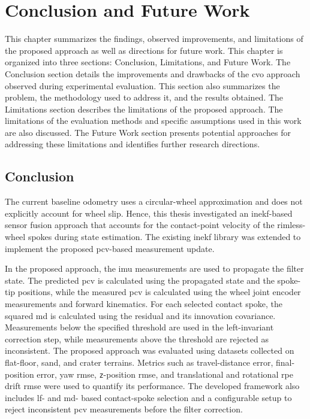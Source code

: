 \documentclass[report.tex]{subfiles}
\begin{document}
    \chapter{Conclusion and Future Work} \label{chap:conclusionandfuturework}

    This chapter summarizes the findings, observed improvements, and limitations of the proposed approach as well as directions for future work. This chapter is organized into three sections: Conclusion, Limitations, and Future Work. The Conclusion section details the improvements and drawbacks of the \gls{cvo} approach observed during experimental evaluation. This section also summarizes the problem, the methodology used to address it, and the results obtained. The Limitations section describes the limitations of the proposed approach. The limitations of the evaluation methods and specific assumptions used in this work are also discussed. The Future Work section presents potential approaches for addressing these limitations and identifies further research directions.
    
    \section{Conclusion}

    The current baseline odometry uses a circular-wheel approximation and does not explicitly account for wheel slip. Hence, this thesis investigated an \gls{inekf}-based sensor fusion approach that accounts for the contact-point velocity of the rimless-wheel spokes during state estimation. The existing \gls{inekf} library was extended to implement the proposed \gls{pcv}-based measurement update.

    In the proposed approach, the \gls{imu} measurements are used to propagate the filter state. The predicted \gls{pcv} is calculated using the propagated state and the spoke-tip positions, while the measured \gls{pcv} is calculated using the wheel joint encoder measurements and forward kinematics. For each selected contact spoke, the squared \gls{md} is calculated using the residual and its innovation covariance. Measurements below the specified threshold are used in the left-invariant correction step, while measurements above the threshold are rejected as inconsistent. The proposed approach was evaluated using datasets collected on flat-floor, sand, and crater terrains. Metrics such as travel-distance error, final-position error, yaw \gls{rmse}, \texttt{z}-position \gls{rmse}, and translational and rotational \gls{rpe} drift \gls{rmse} were used to quantify its performance. The developed framework also includes \gls{lf}- and \gls{md}- based contact-spoke selection and a configurable setup to reject inconsistent \gls{pcv} measurements before the filter correction.
       
\end{document}
